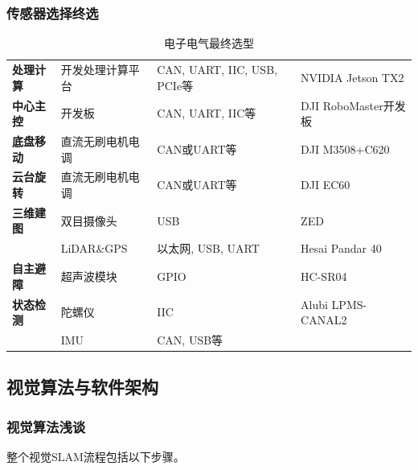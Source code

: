 \subsubsection{传感器选择终选}

\begin{table}[H]
	\centering%
	\caption[centering]{电子电气最终选型}%
	\label{dzdqzu}%
	\begin{tabular}{C{2cm}C{3cm}C{5cm}C{3cm}}	
		\toprule
		 & & &\\ 
		\midrule
		
		\textbf{处理计算} & 开发处理计算平台 & CAN, UART, IIC, USB, PCIe等 & NVIDIA Jetson TX2\\
		\textbf{中心主控} & 开发板 & CAN, UART, IIC等 & DJI RoboMaster开发板\\
		\textbf{底盘移动} & 直流无刷电机电调 & CAN或UART等 & DJI M3508+C620 \\
		\textbf{云台旋转} & 直流无刷电机电调 & CAN或UART等 & DJI EC60 \\
		\textbf{三维建图} & 双目摄像头 & USB & ZED \\
		& LiDAR\&GPS & 以太网, USB, UART & Hesai Pandar 40 \\
		\textbf{自主避障} & 超声波模块 & GPIO & HC-SR04 \\
		\textbf{状态检测} & 陀螺仪 & IIC & Alubi LPMS-CANAL2 \\
		& IMU & CAN, USB等\\
		\bottomrule
	\end{tabular}
\end{table}

\subsection{视觉算法与软件架构}

\subsubsection{视觉算法浅谈}

整个视觉SLAM流程包括以下步骤。

